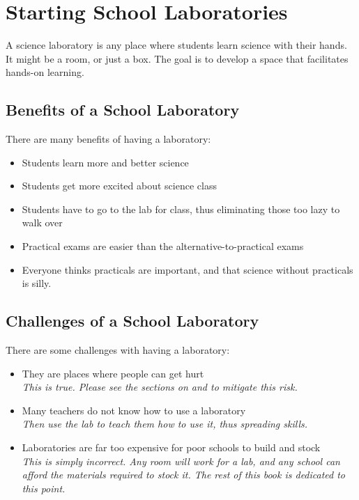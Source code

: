 \chapter{Starting School Laboratories}

A science laboratory is any place 
where students learn science with their hands. 
It might be a room, 
or just a box. 
The goal is to develop a space that facilitates hands-on learning.

\section{Benefits of a School Laboratory}
There are many benefits of having a laboratory:
\begin{itemize}
\item{Students learn more and better science}
\item{Students get more excited about science class}
\item{Students have to go to the lab for class, 
thus eliminating those too lazy to walk over}
\item{Practical exams are easier than the alternative-to-practical exams}
\item{Everyone thinks practicals are important, 
and that science without practicals is silly.}
\end{itemize}

\section{Challenges of a School Laboratory}
There are some challenges with having a laboratory:
\begin{itemize}
\item{They are places where people can get hurt\\
\textit{This is true. 
Please see the sections on  and  
to mitigate this risk.}}
\item{Many teachers do not know how to use a laboratory\\
\textit{Then use the lab to teach them how to use it, thus spreading skills.}}
\item{Laboratories are far too expensive for poor schools to build and stock\\
\textit{This is simply incorrect. 
Any room will work for a lab, 
and any school can afford the materials required to stock it. 
The rest of this book is dedicated to this point.}}
\end{itemize}

